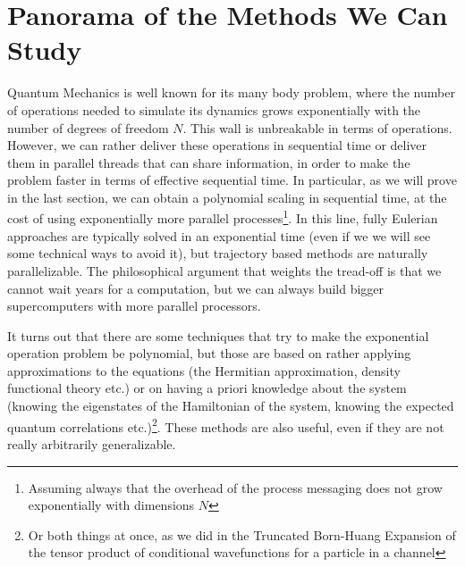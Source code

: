 \documentclass[11pt, a4paper]{article} %
\begin{document}
\section*{Panorama of the Methods We Can Study \vspace{-0.15cm}}
Quantum Mechanics is well known for its many body problem, where the number of operations needed to simulate its dynamics grows exponentially with the number of degrees of freedom $N$. This wall is unbreakable in terms of operations. However, we can rather deliver these operations in sequential time or deliver them in parallel threads that can share information, in order to make the problem faster in terms of effective sequential time. In particular, as we will prove in the last section, we can obtain a polynomial scaling in sequential time, at the cost of using exponentially more parallel processes\footnote{Assuming always that the overhead of the process messaging does not grow exponentially with dimensions $N$}. In this line, fully Eulerian approaches are typically solved in an exponential time (even if we we will see some technical ways to avoid it), but trajectory based methods are naturally parallelizable. The philosophical argument that weights the tread-off is that we cannot wait years for a computation, but we can always build bigger supercomputers with more parallel processors.

It turns out that there are some techniques that try to make the exponential operation problem be polynomial, but those are based on rather applying approximations to the equations (the Hermitian approximation, density functional theory etc.) or on having a priori knowledge about the system (knowing the eigenstates of the Hamiltonian of the system, knowing the expected quantum correlations etc.)\footnote{Or both things at once, as we did in the Truncated Born-Huang Expansion of the tensor product of conditional wavefunctions for a particle in a channel}. These methods are also useful, even if they are not really arbitrarily generalizable.
\end{document}
